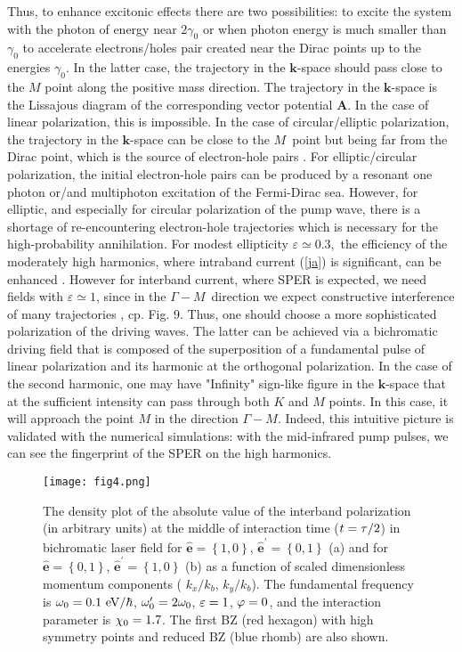 \documentclass[reprint, superscriptaddress,  aps, pra]{revtex4-2}
\begin{document}
Thus, to enhance excitonic effects there are two possibilities: to excite
the system with the photon of energy near $2\gamma _{0}$ \cite{2019-2} or
when photon energy is much smaller than $\gamma _{0}$ to accelerate
electrons/holes pair created near the Dirac points up to the energies $%
\gamma _{0}$. In the latter case, the trajectory in the $\mathbf{k}$-space
should pass close to the $M$ point along the positive mass direction. The
trajectory in the $\mathbf{k}$-space is the Lissajous diagram of the
corresponding vector potential $\mathbf{A}$. In the case of linear
polarization, this is impossible. In the case of circular/elliptic
polarization, the trajectory in the $\mathbf{k}$-space can be close to the $M
$\ point but being far from the Dirac point, which is the source of
electron-hole pairs \cite{Zurr}. For elliptic/circular polarization, the
initial electron-hole pairs can be produced by a resonant one photon or/and
multiphoton excitation of the Fermi-Dirac sea. However, for elliptic, and
especially for circular polarization of the pump wave, there is a shortage
of re-encountering electron-hole trajectories which is necessary for the
high-probability annihilation. For modest ellipticity $\varepsilon \simeq 0.3
$,\ the efficiency of the moderately high harmonics, where intraband current
(\ref{ja}) is significant, can be enhanced \cite{Yoshikawa}. However for
interband current, where SPER is expected, we need fields with $\varepsilon
\simeq 1$, since in the $\Gamma -M$\ direction we expect constructive
interference of many trajectories \cite{Uzan-Ivanov}, cp. Fig. 9. Thus, one
should choose a more sophisticated polarization of the driving waves. The
latter can be achieved via a bichromatic driving field that is composed of
the superposition of a fundamental pulse of linear polarization and its
harmonic at the orthogonal polarization. In the case of the second harmonic,
one may have "Infinity" sign-like figure in the $\mathbf{k}$-space that at
the sufficient intensity can pass through both $K$ and $M$ points. In this
case, it will approach the point $M$ in the direction $\Gamma -M$. Indeed,
this intuitive picture is validated with the numerical simulations: with the
mid-infrared pump pulses, we can see the fingerprint of the SPER on the high
harmonics. 
\begin{figure}[tbp]
\texttt{[image: fig4.png]}
\caption{The density plot of the absolute value of the interband
polarization (in arbitrary units) at the middle of interaction time ($t=%
\protect\tau /2$) in bichromatic laser field for $\hat{\mathbf{e}}=\left\{
1,0\right\} $, $\hat{\mathbf{e}}^{\prime }=\left\{ 0,1\right\} $ (a) and for 
$\hat{\mathbf{e}}=\left\{ 0,1\right\} $, $\hat{\mathbf{e}}^{\prime }=\left\{
1,0\right\} $ (b) as a function of scaled dimensionless momentum components (%
$k_{x}/k_{b}$, $k_{y}/k_{b}$). The fundamental frequency is $\protect\omega %
_{0}=0.1\ \mathrm{eV}/\hbar $, $\protect\omega _{0}^{\prime }=2\protect%
\omega _{0}$, $\protect\varepsilon =1$, $\protect\varphi =0$, and the
interaction parameter is $\protect\chi _{0}=1.7$. The first BZ (red hexagon)
with high symmetry points and reduced BZ (blue rhomb) are also shown.}
\end{figure}
\end{document}
